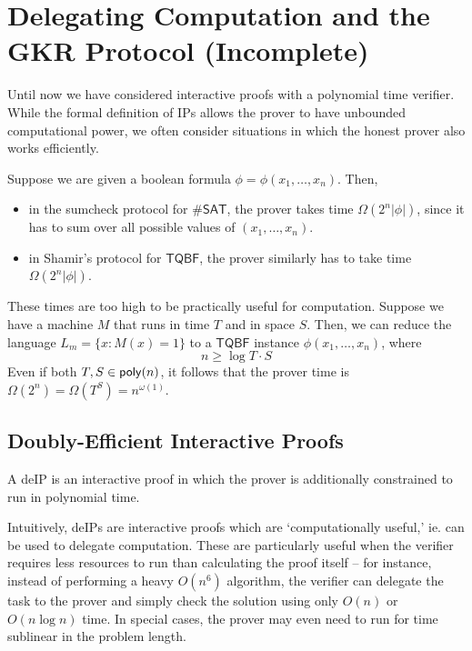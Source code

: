 \section{Delegating Computation and the GKR Protocol (Incomplete)}

Until now we have considered interactive proofs with a polynomial time verifier. While the formal definition of IPs allows the prover to have unbounded computational power, we often consider situations in which the honest prover also works efficiently.

Suppose we are given a boolean formula $\phi=\phi(x_1,\dots,x_n)$. Then,
\begin{itemize}
	\item in the sumcheck protocol for $\#\mathsf{SAT}$, the prover takes time $\Omega(2^n|\phi|)$, since it has to sum over all possible values of $(x_1,\dots,x_n)$.
	\item in Shamir's protocol for $\mathsf{TQBF}$, the prover similarly has to take time $\Omega(2^n|\phi|)$.
\end{itemize}

These times are too high to be practically useful for computation. Suppose we have a machine $M$ that runs in time $T$ and in space $S$. Then, we can reduce the language $L_m=\{x:M(x)=1\}$ to a $\mathsf{TQBF}$ instance $\phi(x_1,\dots,x_n)$, where $$n\geq \log{T}\cdot S$$ Even if both $T,S\in\mathsf{poly}(n)$, it follows that the prover time is $\Omega(2^n)=\Omega(T^S)=n^{\omega(1)}$.

\subsection{Doubly-Efficient Interactive Proofs}

\begin{definition}
	A deIP is an interactive proof in which the prover is additionally constrained to run in polynomial time.
\end{definition}

Intuitively, deIPs are interactive proofs which are `computationally useful,' ie. can be used to delegate computation. These are particularly useful when the verifier requires less resources to run than calculating the proof itself -- for instance, instead of performing a heavy $O(n^6)$ algorithm, the verifier can delegate the task to the prover and simply check the solution using only $O(n)$ or $O(n\log n)$ time. In special cases, the prover may even need to run for time sublinear in the problem length.

